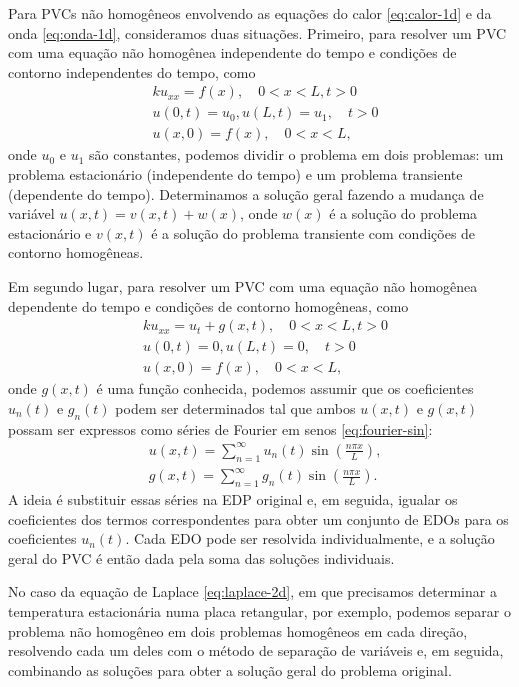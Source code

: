 \documentclass{article}
\theoremstyle{plain}
\theoremstyle{definition}
\theoremstyle{remark}
\begin{document}
Para PVCs não homogêneos envolvendo as equações do calor \eqref{eq:calor-1d} e da onda \eqref{eq:onda-1d}, consideramos duas situações. Primeiro, para resolver um PVC com uma equação não homogênea independente do tempo e condições de contorno independentes do tempo, como 
    \begin{align}
        &k u_{xx} = f(x), \quad 0 < x < L, t > 0 \\
        & u(0, t) = u_0, u(L, t) = u_1, \quad t > 0 \\
        & u(x, 0) = f(x), \quad 0 < x < L,
    \end{align}
    \noindent onde \(u_0\) e \(u_1\) são constantes, podemos dividir o problema em dois problemas: um problema estacionário (independente do tempo) e um problema transiente (dependente do tempo). Determinamos a solução geral fazendo a mudança de variável \(u(x,t) = v(x,t) + w(x)\), onde \(w(x)\) é a solução do problema estacionário e \(v(x,t)\) é a solução do problema transiente com condições de contorno homogêneas.

Em segundo lugar, para resolver um PVC com uma equação não homogênea dependente do tempo e condições de contorno homogêneas, como 
    \begin{align}
        &k u_{xx} = u_t + g(x,t), \quad 0 < x < L, t > 0 \\
        & u(0, t) = 0, u(L, t) = 0, \quad t > 0 \\
        & u(x, 0) = f(x), \quad 0 < x < L,
    \end{align}
    \noindent onde \(g(x,t)\) é uma função conhecida, podemos assumir que os coeficientes \(u_n(t)\) e \(g_n(t)\) podem ser determinados tal que ambos \(u(x,t)\) e \(g(x,t)\) possam ser expressos como séries de Fourier em senos \eqref{eq:fourier-sin}:
    \begin{align}
        &u(x,t) = \sum_{n=1}^{\infty} u_n(t) \sin\left(\frac{n\pi x}{L}\right), \\
        &g(x,t) = \sum_{n=1}^{\infty} g_n(t) \sin\left(\frac{n\pi x}{L}\right).
    \end{align}
    A ideia é substituir essas séries na EDP original e, em seguida, igualar os coeficientes dos termos correspondentes para obter um conjunto de EDOs para os coeficientes \(u_n(t)\). Cada EDO pode ser resolvida individualmente, e a solução geral do PVC é então dada pela soma das soluções individuais.

No caso da equação de Laplace \eqref{eq:laplace-2d}, em que precisamos determinar a temperatura estacionária numa placa retangular, por exemplo, podemos separar o problema não homogêneo em dois problemas homogêneos em cada direção, resolvendo cada um deles com o método de separação de variáveis e, em seguida, combinando as soluções para obter a solução geral do problema original.
\end{document}
